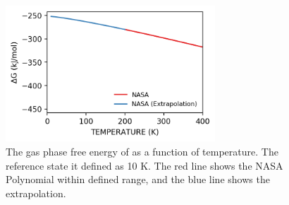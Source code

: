 \documentclass[12pt]{article}
\begin{document}
\begin{figure}[H]
    \centering
    \includegraphics[width=0.70\textwidth]{zi-images/00-General-Graphics/2021-figure-H2O-pMuTT.png}
    \caption{The gas phase free energy of  as a function of temperature. The reference state it defined as 10 K. The red line shows the NASA Polynomial within defined range, and the blue line shows the extrapolation.}    \label{fig:h2o-pmutt-expression}
\end{figure}

\end{document}
